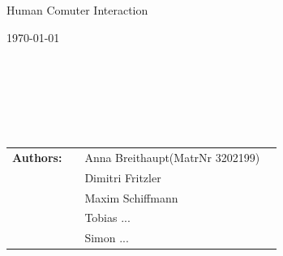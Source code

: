 \begin{center}
	\Large{Human Comuter Interaction}
\end{center}
\begin{center}

\end{center}
\begin{center}
{\large \today\par}
\end{center}
\begin{verbatim}






\end{verbatim}
\begin{flushleft}
\begin{tabular}{llll}
\textbf{Authors:} & & Anna Breithaupt(MatrNr 3202199)\\  &&Dimitri Fritzler\\ &&Maxim Schiffmann\\ &&Tobias ...\\ &&Simon ...
\end{tabular}
\end{flushleft}



